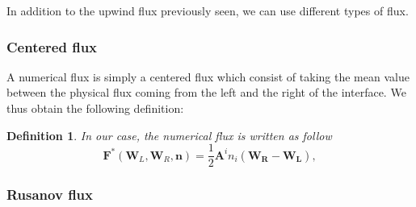 \documentclass[a4paper,oneside,10pt]{report}
\newtheorem{mydef}{Definition}
\begin{document}
In addition to the upwind flux previously seen, we can use different types of flux.

\subsubsection{Centered flux}
A numerical flux is simply a centered flux which consist of taking the mean value between the physical flux coming from the left and the right of the interface. We thus obtain the following definition:
\begin{mydef}
In our case, the numerical flux is written as follow
\begin{equation}
 \mathbf{F}^*( \mathbf{W}_L,\mathbf{W}_R,\mathbf{n})  = \frac{1}{2}\mathbf{A}^i n_i(\mathbf{W_R} - \mathbf{W_L}),
 \end{equation}
\end{mydef}


\subsubsection{Rusanov flux}
\end{document}
